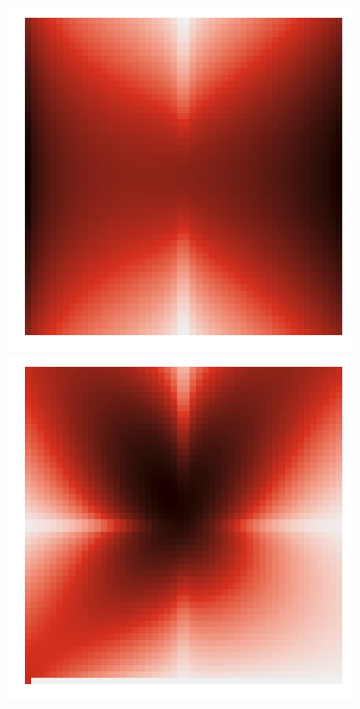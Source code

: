\documentclass{article}
\begin{document}
\begin{figure}[t!]
	\begin{subfigure}{0.3\textwidth}
		\includegraphics[width=\linewidth]{figures/p_smooth6}\\
		\includegraphics[width=\linewidth]{figures/p_smooth7}\\

\end{subfigure}
\end{figure}
\end{document}
